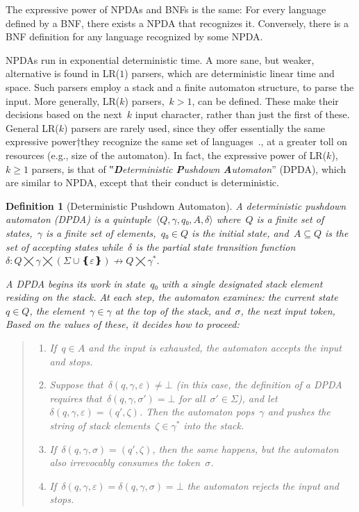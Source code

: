 \documentclass[a4paper,USenglish]{lipics-v2016}
\newtheorem{Definition}{Definition}
\numberwithin{equation}{section}
\numberwithin{figure}{section}
\begin{document}
The expressive power of NPDAs and BNFs is the same:
  For every language defined by a BNF, there exists a NPDA that recognizes it.
Conversely, there is a BNF definition for any language recognized by some NPDA.

NPDAs run in exponential deterministic time.
 A more sane, but weaker, alternative is found in LR($1$) parsers,
  which are deterministic linear time and space.
Such parsers employ a stack and a finite automaton structure,
  to parse the input.
 More generally, LR($k$) parsers,~$k>1$, can be defined. These make their
 decisions based on the next~$k$ input character, rather than just the first of these.
 General LR($k$) parsers are rarely used, since they offer essentially
 the same expressive power†{they recognize the same set of languages~\cite{Knuth:65}.},
 at a greater toll on resources (e.g., size of the automaton).
In fact, the expressive power of LR($k$),~$k\ge1$ parsers, is that
 of ‟\emph{\textbf Deterministic \textbf Pushdown \textbf Automaton}” (DPDA),
  which are similar to NPDA, except that their conduct is deterministic.

\begin{Definition}[Deterministic Pushdown Automaton]
  \label{Definition:DPDA}
  \slshape
  A \textit{deterministic pushdown automaton} (DPDA) is a quintuple~$⟨Q,\gamma,q₀,A,δ⟩$
  where~$Q$ is a finite set of \emph{states},~$\gamma$ is a finite
  \emph{set of elements},~$q₀∈Q$ is the initial state,
  and~$A⊆Q$ is the \emph{set of accepting states} while~$δ$ is
  the \emph{partial state transition function}~$δ:Q⨉\gamma⨉(Σ∪❴ε❵)↛Q⨉\gamma^*$.
  \par
  A DPDA begins its work in state~$q₀$ with a single designated stack element residing on the stack.
  At each step, the automaton examines: the current state~$q∈Q$, 
  the element~$\gamma∈\gamma$ at the top of the stack, and~$σ$, the next input token, 
  Based on the values of these, it decides how to proceed:
  \begin{quote}
  \begin{enumerate}
    \item If~$q∈A$ and the input is exhausted, the automaton accepts the input and stops.
    \item Suppose that~$δ(q,\gamma,ε)≠⊥$ (in this case, the definition of a DPDA
          requires that~$δ(q,\gamma,σ')=⊥$ for all~$σ'∈Σ$), and let~$δ(q,\gamma,ε)=(q',ζ)$.
          Then the automaton pops~$\gamma$ and pushes the string of stack
          elements~$ζ∈\gamma^*$ into the stack.
    \item If~$δ(q,\gamma,σ)=(q',ζ)$, then the same happens, but the automaton also
          irrevocably consumes the token~$σ$.
    \item If~$δ(q,\gamma,ε)=δ(q,\gamma,σ)=⊥$ the automaton rejects the input and stops.
  \end{enumerate}
  \end{quote}
\end{Definition}
\end{document}
